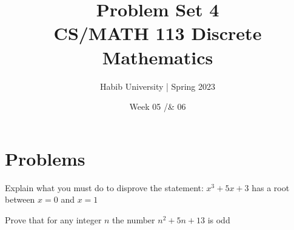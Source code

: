 \documentclass{article}
\newenvironment{problem}[2][Problem]{\begin{trivlist}
\item[\hskip \labelsep {\bfseries #1}\hskip \labelsep {\bfseries #2.}]}{\end{trivlist}}
\begin{document}
\title{Problem Set 4\\CS/MATH 113 Discrete Mathematics}
\author{Habib University | Spring 2023}
\date{Week 05 /& 06}
\maketitle

\section{Problems}

\begin{problem}{1}
Explain what you must do to disprove the statement:
$x^3+5x + 3$ has a root between $x = 0$ and $x=1$
\end{problem}

\begin{problem}{2}
Prove that for any integer $n$ the number $n^2+5n+13$ is odd
\end{problem}
\end{document}
